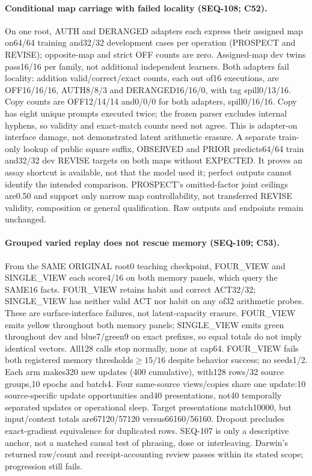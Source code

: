\documentclass{article}
\begin{document}
\paragraph{Conditional map carriage with failed locality (SEQ-108; C52).} On one root, AUTH and DERANGED adapters each express their assigned map on64/64 training and32/32 development cases per operation (PROSPECT and REVISE); opposite-map and strict OFF counts are zero. Assigned-map dev twins pass16/16 per family, not additional independent learners. Both adapters fail locality: addition valid/correct/exact counts, each out of16 executions, are OFF16/16/16, AUTH8/8/3 and DERANGED16/16/0, with tag spill0/13/16. Copy counts are OFF12/14/14 and0/0/0 for both adapters, spill0/16/16. Copy has eight unique prompts executed twice; the frozen parser excludes internal hyphens, so validity and exact-match counts need not agree. This is adapter-on interface damage, not demonstrated latent arithmetic erasure. A separate train-only lookup of public square suffix, OBSERVED and PRIOR predicts64/64 train and32/32 dev REVISE targets on both maps without EXPECTED. It proves an assay shortcut is available, not that the model used it; perfect outputs cannot identify the intended comparison. PROSPECT's omitted-factor joint ceilings are0.50 and support only narrow map controllability, not transferred REVISE validity, composition or general qualification. Raw outputs and endpoints remain unchanged.

\paragraph{Grouped varied replay does not rescue memory (SEQ-109; C53).} From the SAME ORIGINAL root0 teaching checkpoint, FOUR\_VIEW and SINGLE\_VIEW each score4/16 on both memory panels, which query the SAME16 facts. FOUR\_VIEW retains habit and correct ACT32/32; SINGLE\_VIEW has neither valid ACT nor habit on any of32 arithmetic probes. These are surface-interface failures, not latent-capacity erasure. FOUR\_VIEW emits yellow throughout both memory panels; SINGLE\_VIEW emits green throughout dev and blue7/green9 on exact prefixes, so equal totals do not imply identical vectors. All128 calls stop normally, none at cap64. FOUR\_VIEW fails both registered memory thresholds$\geq15/16$ despite behavior success; no seeds1/2. Each arm makes320 new updates (400 cumulative), with128 rows/32 source groups,10 epochs and batch4. Four same-source views/copies share one update:10 source-specific update opportunities and40 presentations, not40 temporally separated updates or operational sleep. Target presentations match10000, but input/context totals are67120/57120 versus66160/56160. Dropout precludes exact-gradient equivalence for duplicated rows. SEQ-107 is only a descriptive anchor, not a matched causal test of phrasing, dose or interleaving. Darwin's returned raw/count and receipt-accounting review passes within its stated scope; progression still fails.
\end{document}
